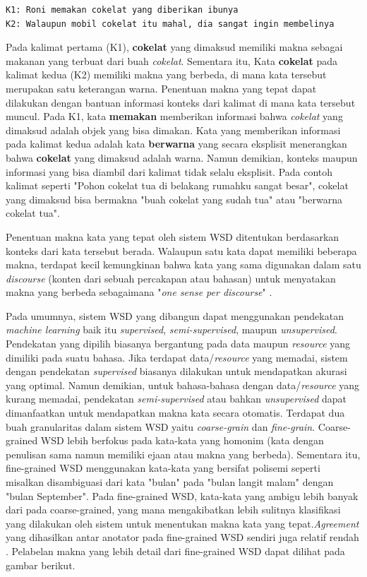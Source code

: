 \begin{lstlisting}[backgroundcolor = \color{white}]
K1: Roni memakan cokelat yang diberikan ibunya
K2: Walaupun mobil cokelat itu mahal, dia sangat ingin membelinya
\end{lstlisting}


Pada kalimat pertama (K1), \textbf{cokelat} yang dimaksud memiliki makna sebagai makanan yang terbuat dari buah \textit{cokelat}. Sementara itu, Kata \textbf{cokelat} pada kalimat kedua (K2) memiliki makna yang berbeda, di mana kata tersebut merupakan satu keterangan warna. Penentuan makna yang tepat dapat dilakukan dengan bantuan informasi konteks dari kalimat di mana kata tersebut muncul. Pada K1, kata \textbf{memakan} memberikan informasi bahwa \textit{cokelat} yang dimaksud adalah objek yang bisa dimakan. Kata yang memberikan informasi pada kalimat kedua adalah kata \textbf{berwarna} yang secara eksplisit menerangkan bahwa \textbf{cokelat} yang dimaksud adalah warna. Namun demikian, konteks maupun informasi yang bisa diambil dari kalimat tidak selalu eksplisit. Pada contoh kalimat seperti "Pohon cokelat tua di belakang rumahku sangat besar", cokelat yang dimaksud bisa bermakna "buah cokelat yang sudah tua" atau "berwarna cokelat tua".

Penentuan makna kata yang tepat oleh sistem WSD ditentukan berdasarkan konteks dari kata tersebut berada. Walaupun satu kata dapat memiliki beberapa makna, terdapat kecil kemungkinan bahwa kata yang sama digunakan dalam satu \textit{discourse} (konten dari sebuah percakapan atau bahasan) untuk menyatakan makna yang berbeda sebagaimana "\textit{one sense per discourse}" \citep{gale1992one}.

Pada umumnya, sistem WSD yang dibangun dapat menggunakan pendekatan \textit{machine learning} baik itu \textit{supervised}, \textit{semi-supervised}, maupun \textit{unsupervised}. Pendekatan yang dipilih biasanya bergantung pada data maupun \textit{resource} yang dimiliki pada suatu bahasa. Jika terdapat data/\textit{resource} yang memadai, sistem dengan pendekatan \textit{supervised} biasanya dilakukan untuk mendapatkan akurasi yang optimal. Namun demikian, untuk bahasa-bahasa dengan data/\textit{resource} yang kurang memadai, pendekatan \textit{semi-supervised} atau bahkan \textit{unsupervised} dapat dimanfaatkan untuk mendapatkan makna kata secara otomatis. Terdapat dua buah granularitas dalam sistem WSD yaitu \textit{coarse-grain} dan \textit{fine-grain}. Coarse-grained WSD lebih berfokus pada kata-kata yang homonim (kata dengan penulisan sama namun memiliki ejaan atau makna yang berbeda). Sementara itu, fine-grained WSD menggunakan kata-kata yang bersifat polisemi seperti misalkan disambiguasi dari kata "bulan" pada "bulan langit malam" dengan "bulan September". Pada fine-grained WSD, kata-kata yang ambigu lebih banyak dari pada coarse-grained, yang mana mengakibatkan lebih sulitnya klasifikasi yang dilakukan oleh sistem untuk menentukan makna kata yang tepat.\textit{Agreement} yang dihasilkan antar anotator pada fine-grained WSD sendiri juga relatif rendah \citep{navigli2007semeval}. Pelabelan makna yang lebih detail dari fine-grained WSD dapat dilihat pada gambar berikut.

